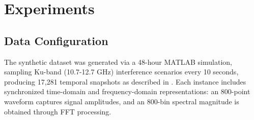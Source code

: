 \documentclass[conference]{IEEEtran}
\begin{document}
\section{Experiments}
\label{sec:experiments}





\subsection{Data Configuration}

The synthetic dataset was generated via a 48-hour MATLAB simulation, sampling Ku-band (10.7-12.7 GHz) interference scenarios every 10 seconds, producing 17,281 temporal snapshots as described in \cite{saifaldawlaGenAIBasedModelsNGSO2024}. Each instance includes synchronized time-domain and frequency-domain representations: an 800-point waveform captures signal amplitudes, and an 800-bin spectral magnitude is obtained through FFT processing.
\end{document}
